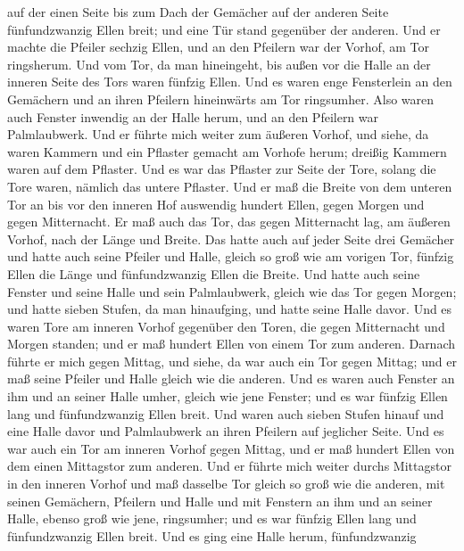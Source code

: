 auf der einen Seite bis zum Dach der Gemächer auf der anderen Seite
fünfundzwanzig Ellen breit; und eine Tür stand gegenüber der anderen.
 Und er machte die Pfeiler sechzig Ellen, und an den
Pfeilern war der Vorhof, am Tor ringsherum.  Und vom Tor,
da man hineingeht, bis außen vor die Halle an der inneren Seite des Tors
waren fünfzig Ellen.  Und es waren enge Fensterlein an
den Gemächern und an ihren Pfeilern hineinwärts am Tor ringsumher. Also
waren auch Fenster inwendig an der Halle herum, und an den Pfeilern war
Palmlaubwerk.  Und er führte mich weiter zum äußeren
Vorhof, und siehe, da waren Kammern und ein Pflaster gemacht am Vorhofe
herum; dreißig Kammern waren auf dem Pflaster.  Und es
war das Pflaster zur Seite der Tore, solang die Tore waren, nämlich das
untere Pflaster.  Und er maß die Breite von dem unteren
Tor an bis vor den inneren Hof auswendig hundert Ellen, gegen Morgen und
gegen Mitternacht.  Er maß auch das Tor, das gegen
Mitternacht lag, am äußeren Vorhof, nach der Länge und Breite.
 Das hatte auch auf jeder Seite drei Gemächer und hatte
auch seine Pfeiler und Halle, gleich so groß wie am vorigen Tor, fünfzig
Ellen die Länge und fünfundzwanzig Ellen die Breite.  Und
hatte auch seine Fenster und seine Halle und sein Palmlaubwerk, gleich
wie das Tor gegen Morgen; und hatte sieben Stufen, da man hinaufging,
und hatte seine Halle davor.  Und es waren Tore am
inneren Vorhof gegenüber den Toren, die gegen Mitternacht und Morgen
standen; und er maß hundert Ellen von einem Tor zum anderen.
 Darnach führte er mich gegen Mittag, und siehe, da war
auch ein Tor gegen Mittag; und er maß seine Pfeiler und Halle gleich wie
die anderen.  Und es waren auch Fenster an ihm und an
seiner Halle umher, gleich wie jene Fenster; und es war fünfzig Ellen
lang und fünfundzwanzig Ellen breit.  Und waren auch
sieben Stufen hinauf und eine Halle davor und Palmlaubwerk an ihren
Pfeilern auf jeglicher Seite.  Und es war auch ein Tor am
inneren Vorhof gegen Mittag, und er maß hundert Ellen von dem einen
Mittagstor zum anderen.  Und er führte mich weiter durchs
Mittagstor in den inneren Vorhof und maß dasselbe Tor gleich so groß wie
die anderen,  mit seinen Gemächern, Pfeilern und Halle
und mit Fenstern an ihm und an seiner Halle, ebenso groß wie jene,
ringsumher; und es war fünfzig Ellen lang und fünfundzwanzig Ellen
breit.  Und es ging eine Halle herum, fünfundzwanzig
